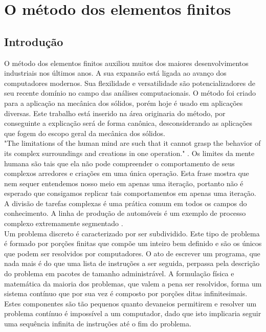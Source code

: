 \chapter{O método dos elementos finitos}

\section{Introdução}
O método dos elementos finitos auxiliou muitos dos maiores desenvolvimentos industriais nos últimos anos. A sua expansão está ligada ao avanço dos computadores modernos. Sua flexilidade e versatilidade são potencializadores de seu recente domínio no campo das análises computacionais. O método foi criado para a aplicação na mecânica dos sólidos, porém hoje é usado em aplicações diversas. Este trabalho está inserido na área originaria do método, por conseguinte a explicação será de forma canônica, desconsiderando as aplicações que fogem do escopo geral da mecânica dos sólidos. \\

"The limitations of the human mind are such that it cannot grasp the behavior of its
complex surroundings and creations in one operation." \cite{zienkiewicz2013}.
Os limites da mente humana são tais que ela não pode compreender o comportamento de seus complexos arredores e criações em uma única operação. Esta frase mostra que nem sequer entendemos nosso meio em apenas uma iteração, portanto não é esperado que consigamos replicar tais comportamentos em apenas uma iteração. A divisão de tarefas complexas é uma prática comum em todos os campos do conhecimento. A linha de produção de automóveis é um exemplo de processo complexo extremamente segmentado .\\ Um problema discreto é caracterizado por ser subdividido. Este tipo de problema é formado por porções finitas que compõe um inteiro bem definido e são os únicos que podem ser resolvidos por computadores. O ato de escrever um programa, que nada mais é do que uma lista de instruções a ser seguida, perpassa pela descrição do problema em pacotes de tamanho administrável. A formulação física e matemática da maioria dos problemas, que valem a pena ser resolvidos, forma um sistema contínuo que por sua vez é composto por porções ditas infinitesimais. Estes componentes são tão pequenos quanto devaneios permitirem e resolver um problema contínuo é impossível a um computador, dado que isto implicaria seguir uma sequência infinita de instruções até o fim do problema. \\ 

